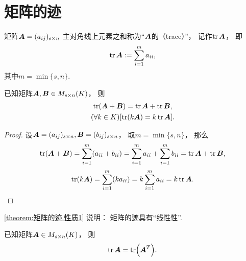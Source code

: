 \section{矩阵的迹}
\begin{definition}
矩阵\(\boldsymbol{A}=(a_{ij})_{s \times n}\)
主对角线上元素之和称为“\(\boldsymbol{A}\)的（trace）”，
记作\(\tr\boldsymbol{A}\)，
即\begin{equation*}
	\tr\boldsymbol{A}
	:=
	\sum_{i=1}^m a_{ii},
\end{equation*}
其中\(m = \min\{s,n\}\).
\end{definition}

\begin{property}\label{theorem:矩阵的迹.性质1}
已知矩阵\(\boldsymbol{A},\boldsymbol{B} \in M_{s \times n}(K)\)，
则\begin{gather}
	\tr(\boldsymbol{A}+\boldsymbol{B}) = \tr\boldsymbol{A} + \tr\boldsymbol{B}, \\
	(\forall k \in K)[\tr(k \boldsymbol{A}) = k \tr\boldsymbol{A}].
\end{gather}
\begin{proof}
设\(\boldsymbol{A}=(a_{ij})_{s \times n},
\boldsymbol{B}=(b_{ij})_{s \times n}\)，
取\(m = \min\{s,n\}\)，
那么\begin{equation*}
	\tr(\boldsymbol{A}+\boldsymbol{B}) = \sum_{i=1}^m (a_{ii}+b_{ii})
	= \sum_{i=1}^m a_{ii}
	+ \sum_{i=1}^m b_{ii}
	= \tr\boldsymbol{A} + \tr\boldsymbol{B},
\end{equation*}\begin{equation*}
	\tr(k \boldsymbol{A}) = \sum_{i=1}^m (k a_{ii})
	= k \sum_{i=1}^m a_{ii}
	= k \tr\boldsymbol{A}.
	\qedhere
\end{equation*}
\end{proof}
\end{property}
\begin{remark}
\cref{theorem:矩阵的迹.性质1} 说明：
矩阵的迹具有“线性性”.
\end{remark}

\begin{property}\label{theorem:矩阵的迹.矩阵转置不变迹}
已知矩阵\(\boldsymbol{A} \in M_{s \times n}(K)\)，
则\begin{equation}
	\tr\boldsymbol{A} = \tr(\boldsymbol{A}^T).
\end{equation}
\end{property}

